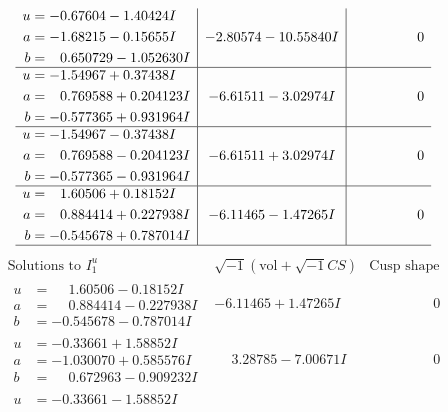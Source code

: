 \documentclass[1p]{elsarticle_modified}
\theoremstyle{definition}
\newcommand{\I}{\sqrt{-1}}
\begin{document}
$$\begin{array}{c|c|c}
\begin{aligned}
u &= -0.67604 - 1.40424 I \\
a &= -1.68215 - 0.15655 I \\
b &= \phantom{-}0.650729 - 1.052630 I\end{aligned}
 & -2.80574 - 10.55840 I & \phantom{-0.000000 } 0 \\ \hline\begin{aligned}
u &= -1.54967 + 0.37438 I \\
a &= \phantom{-}0.769588 + 0.204123 I \\
b &= -0.577365 + 0.931964 I\end{aligned}
 & -6.61511 - 3.02974 I & \phantom{-0.000000 } 0 \\ \hline\begin{aligned}
u &= -1.54967 - 0.37438 I \\
a &= \phantom{-}0.769588 - 0.204123 I \\
b &= -0.577365 - 0.931964 I\end{aligned}
 & -6.61511 + 3.02974 I & \phantom{-0.000000 } 0 \\ \hline\begin{aligned}
u &= \phantom{-}1.60506 + 0.18152 I \\
a &= \phantom{-}0.884414 + 0.227938 I \\
b &= -0.545678 + 0.787014 I\end{aligned}
 & -6.11465 - 1.47265 I & \phantom{-0.000000 } 0\\
 \hline 
 \end{array}$$\newpage$$\begin{array}{c|c|c}  
\text{Solutions to }I^u_{1}& \I (\text{vol} + \sqrt{-1}CS) & \text{Cusp shape}\\
 \hline 
\begin{aligned}
u &= \phantom{-}1.60506 - 0.18152 I \\
a &= \phantom{-}0.884414 - 0.227938 I \\
b &= -0.545678 - 0.787014 I\end{aligned}
 & -6.11465 + 1.47265 I & \phantom{-0.000000 } 0 \\ \hline\begin{aligned}
u &= -0.33661 + 1.58852 I \\
a &= -1.030070 + 0.585576 I \\
b &= \phantom{-}0.672963 - 0.909232 I\end{aligned}
 & \phantom{-}3.28785 - 7.00671 I & \phantom{-0.000000 } 0 \\ \hline\begin{aligned}
u &= -0.33661 - 1.58852 I \\

\end{aligned}
\end{array}$$
\end{document}
